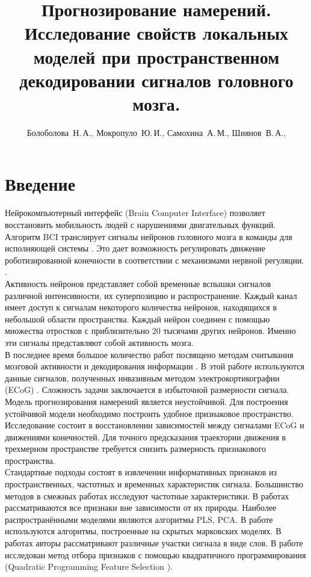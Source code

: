 \documentclass[12pt,twoside]{article}
\title
    [Прогнозирование намерений]
    {Прогнозирование намерений. Исследование свойств локальных моделей при пространственном декодировании сигналов головного мозга.}
\author
    {Болоболова~Н.\,А., Мокропуло~Ю.\,И., Самохина~А.\,М., Шиянов~В.\,А.,}
\begin{document}
\maketitle
\bigskip
\bigskip
\bigskip
\bigskip
\bigskip
\maketitleSecondary

\section{Введение}
Нейрокомпьютерный интерфейс (Brain Computer Interface) \cite{Morishita2014} позволяет восстановить мобильность людей с нарушениями двигательных функций.  Алгоритм BCI транслирует сигналы нейронов головного мозга в команды для исполняющей системы \cite{Morishita2014}. Это дает возможность регулировать движение роботизированной конечности в соответствии с механизмами нервной регуляции. \cite{Donoghue2008}. \\
Активность нейронов представляет собой временные вспышки сигналов различной интенсивности, их суперпозицию и распространение. Каждый канал имеет доступ к сигналам некоторого количества нейронов, находящихся в небольшой области пространства. Каждый нейрон соединен с помощью множества отростков с приблизительно 20 тысячами других нейронов. Именно эти сигналы представляют собой активность мозга.\\
В последнее время большое количество работ посвящено методам считывания мозговой активности и декодирования информации \cite{Hu2018,Song2017,Loza2017,Eliseyev2016,Gaglianese2016,Bundy2016,Morishita2014}.
В этой работе используются данные сигналов, полученных инвазивным методом электрокортикографии (ECoG) \cite{Sirven2014}. Сложность задачи заключается в избыточной размерности сигнала. Модель прогнозирования намерений является неустойчивой. Для построения устойчивой модели необходимо построить удобное признаковое пространство.\\
Исследование состоит в восстановлении зависимостей между сигналами ECoG и движениями конечностей. Для точного предсказания траектории движения в трехмерном пространстве требуется снизить размерность признакового пространства.\\
Стандартные подходы состоят в извлечении информативных признаков из пространственных, частотных и временных характеристик сигнала\cite{Morishita2014,Alexander2013}. Большинство методов в смежных работах исследуют частотные характеристики\cite{Chin2007,Eliseyev2014,Loza2017}. В работах \cite{Eliseyev2016,Motrenko2018} рассматриваются все признаки вне зависимости от их природы. Наиболее распространёнными моделями являются алгоритмы PLS\cite{Rosipal2006,Eliseyev2016}, PCA\cite{Zhao2010,Song2017}. В работе \cite{Zhao2014} используются алгоритмы, построенные на скрытых марковских моделях. В  работах \cite{Loza2017,Song2017} авторы рассматривают различные участки сигнала в виде слов. В работе \cite{Motrenko2018} исследован метод отбора признаков с помощью квадратичного программирования (Quadratic Programming Feature Selection \cite{rodriguez2010quadratic}).\\
\end{document}
